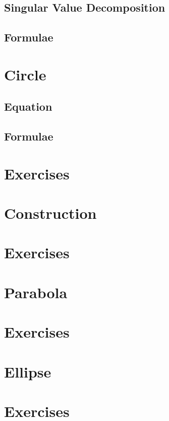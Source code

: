 \documentclass[journal]{IEEEtran}
\begin{document}
\subsection{Singular Value Decomposition}

\subsection{Formulae}

\newpage
\section{Circle}
\subsection{Equation}

\subsection{Formulae}

\iffalse
\section{Exercises}

\section{Construction}

\section{Exercises}

\section{Parabola}

\section{Exercises}

\section{Ellipse}

\section{Exercises}

\end{document}
